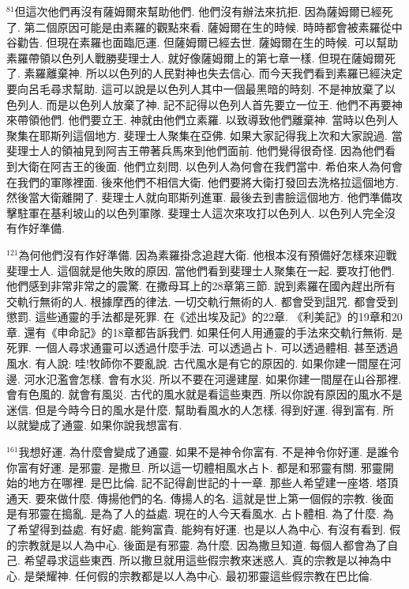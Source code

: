 \documentclass{book}
\begin{document}
$^{81}$但這次他們再沒有薩姆爾來幫助他們.
他們沒有辦法來抗拒.
因為薩姆爾已經死了.
第二個原因可能是由素羅的觀點來看.
薩姆爾在生的時候.
時時都會被素羅從中谷勸告.
但現在素羅也面臨厄運.
但薩姆爾已經去世.
薩姆爾在生的時候.
可以幫助素羅帶領以色列人戰勝斐理士人.
就好像薩姆爾上的第七章一樣.
但現在薩姆爾死了.
素羅離棄神.
所以以色列的人民對神也失去信心.
而今天我們看到素羅已經決定要向呂毛尋求幫助.
這可以說是以色列人其中一個最黑暗的時刻.
不是神放棄了以色列人.
而是以色列人放棄了神.
記不記得以色列人首先要立一位王.
他們不再要神來帶領他們.
他們要立王.
神就由他們立素羅.
以致導致他們離棄神.
當時以色列人聚集在耶斯列這個地方.
斐理士人聚集在亞佛.
如果大家記得我上次和大家說過.
當斐理士人的領袖見到阿吉王帶著兵馬來到他們面前.
他們覺得很奇怪.
因為他們看到大衛在阿吉王的後面.
他們立刻問.
以色列人為何會在我們當中.
希伯來人為何會在我們的軍隊裡面.
後來他們不相信大衛.
他們要將大衛打發回去洗格拉這個地方.
然後當大衛離開了.
斐理士人就向耶斯列進軍.
最後去到書臉這個地方.
他們準備攻擊駐軍在基利坡山的以色列軍隊.
斐理士人這次來攻打以色列人.
以色列人完全沒有作好準備.

$^{121}$為何他們沒有作好準備.
因為素羅掛念追趕大衛.
他根本沒有預備好怎樣來迎戰斐理士人.
這個就是他失敗的原因.
當他們看到斐理士人聚集在一起.
要攻打他們.
他們感到非常非常之的震驚.
在撒母耳上的28章第三節.
說到素羅在國內趕出所有交軌行無術的人.
根據摩西的律法.
一切交軌行無術的人.
都會受到詛咒.
都會受到懲罰.
這些通靈的手法都是死罪.
在《述出埃及記》的22章.
《利美記》的19章和20章.
還有《申命記》的18章都告訴我們.
如果任何人用通靈的手法來交軌行無術.
是死罪.
一個人尋求通靈可以透過什麼手法.
可以透過占卜.
可以透過體相.
甚至透過風水.
有人說: 哇!牧師你不要亂說.
古代風水是有它的原因的.
如果你建一間屋在河邊.
河水氾濫會怎樣.
會有水災.
所以不要在河邊建屋.
如果你建一間屋在山谷那裡.
會有色風的.
就會有風災.
古代的風水就是看這些東西.
所以你說有原因的風水不是迷信.
但是今時今日的風水是什麼.
幫助看風水的人怎樣.
得到好運.
得到富有.
所以就變成了通靈.
如果你說我想富有.

$^{161}$我想好運.
為什麼會變成了通靈.
如果不是神令你富有.
不是神令你好運.
是誰令你富有好運.
是邪靈.
是撒旦.
所以這一切體相風水占卜.
都是和邪靈有關.
邪靈開始的地方在哪裡.
是巴比倫.
記不記得創世記的十一章.
那些人希望建一座塔.
塔頂通天.
要來做什麼.
傳揚他們的名.
傳揚人的名.
這就是世上第一個假的宗教.
後面是有邪靈在搗亂.
是為了人的益處.
現在的人今天看風水.
占卜體相.
為了什麼.
為了希望得到益處.
有好處.
能夠富貴.
能夠有好運.
也是以人為中心.
有沒有看到.
假的宗教就是以人為中心.
後面是有邪靈.
為什麼.
因為撒旦知道.
每個人都會為了自己.
希望尋求這些東西.
所以撒旦就用這些假宗教來迷惑人.
真的宗教是以神為中心.
是榮耀神.
任何假的宗教都是以人為中心.
最初邪靈這些假宗教在巴比倫.
\end{document}
